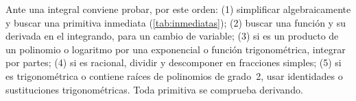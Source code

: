 Ante una integral conviene probar, por este orden: (1) simplificar algebraicamente y buscar una primitiva inmediata (\cref{tab:inmediatas}); (2) buscar una función y su derivada en el integrando, para un cambio de variable; (3) si es un producto de un polinomio o logaritmo por una exponencial o función trigonométrica, integrar por partes; (4) si es racional, dividir y descomponer en fracciones simples; (5) si es trigonométrica o contiene raíces de polinomios de grado~2, usar identidades o sustituciones trigonométricas. Toda primitiva se comprueba derivando.

\addtocounter{definicion}{1}%

\addtocounter{definicion}{1}%

